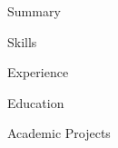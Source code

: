 \documentclass{resume} %
\begin{document}

\begin{rSection}{Summary}

\end{rSection}


\begin{rSection}{Skills}

\end{rSection}


\begin{rSection}{Experience}

\end{rSection}


\begin{rSection}{Education}

\end{rSection}

\pagebreak


\begin{rSection}{Academic Projects}

\end{rSection}

\end{document}
